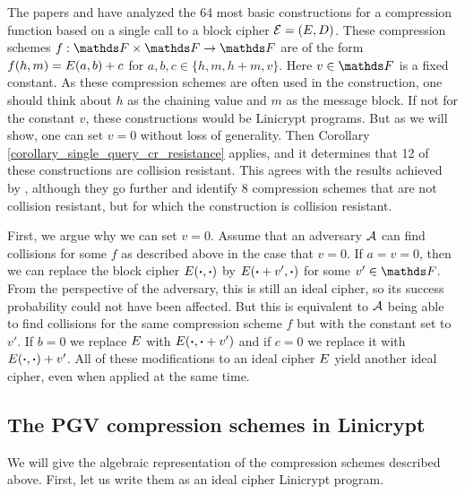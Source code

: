 The papers \cite{C:BlaRogShr02} and \cite{C:PreGovVan93} have analyzed the 64 most basic constructions for a compression function
based on a single call to a block cipher $\mathcal{E} = (E, D)$.
These compression schemes $f: \F \times \F \to \F$ are of the form $f(h, m) = E(a, b) + c$ for $a,b,c \in \{h, m, h+m, v\}$.
Here $v \in \F$ is a fixed constant.
As these compression schemes are often used in the \MD construction,
one should think about $h$ as the chaining value and $m$ as the message block.
If not for the constant $v$, these constructions would be Linicrypt programs.
But as we will show, one can set $v=0$ without loss of generality.
Then Corollary \ref{corollary_single_query_cr_resistance} applies,
and it determines that 12 of these constructions are collision resistant.
This agrees with the results achieved by \cite{C:BlaRogShr02},
although they go further and identify 8 compression schemes that are not collision resistant,
but for which the \MD construction is collision resistant.

First, we argue why we can set $v=0$.
Assume that an adversary $\mathcal{A}$ can find collisions for some $f$ as described above in the case that $v=0$.
If $a = v = 0$, then we can replace the block cipher $E(\boldsymbol\cdot, \boldsymbol\cdot)$ by $E(\boldsymbol\cdot + v', \boldsymbol\cdot)$ for some $v' \in \F$.
From the perspective of the adversary,
this is still an ideal cipher,
so its success probability could not have been affected.
But this is equivalent to $\mathcal{A}$ being able to find collisions for the same compression scheme $f$ but with the constant set to $v'$.
If $b=0$ we replace $E$ with $E(\boldsymbol\cdot, \boldsymbol\cdot + v')$ and if $c=0$ we replace it with $E(\boldsymbol\cdot, \boldsymbol\cdot) + v'$.
All of these modifications to an ideal cipher $E$ yield another ideal cipher,
even when applied at the same time.

\subsection{The PGV compression schemes in Linicrypt}
We will give the algebraic representation of the compression schemes described above.
First, let us write them as an ideal cipher Linicrypt program. 

